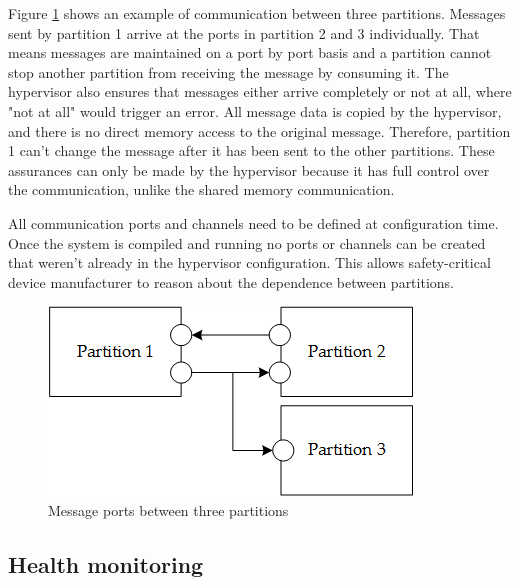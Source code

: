 Figure \ref{fig:message_ports} shows an example of communication between three partitions. 
Messages sent by partition 1 arrive at the ports in partition 2 and 3 individually. That means messages are maintained on a port by port basis and a partition cannot stop another partition from receiving the message by consuming it. The hypervisor also ensures that messages either arrive completely or not at all, where "not at all" would trigger an error. All message data is copied by the hypervisor, and there is no direct memory access to the original message. Therefore, partition 1 can't change the message after it has been sent to the other partitions. These assurances can only be made by the hypervisor because it has full control over the communication, unlike the shared memory communication.

All communication ports and channels need to be defined at configuration time. Once the system is compiled and running no ports or channels can be created that weren't already in the hypervisor configuration. This allows safety-critical device manufacturer to reason about the dependence between partitions.
\begin{figure}[hb!]
\centering
\includegraphics[scale=0.75]{Figures/message_ports.png}
\decoRule
\caption{Message ports between three partitions}
\label{fig:message_ports}
\end{figure}


\subsection{Health monitoring}

